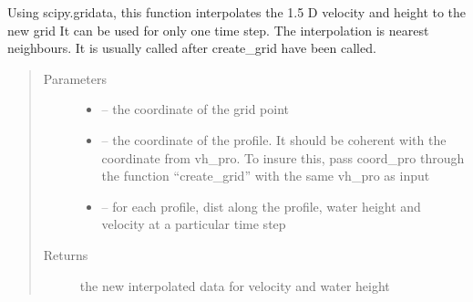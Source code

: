 \documentclass[letterpaper,10pt,english]{sphinxmanual}
\begin{document}
\begin{fulllineitems}
\label{\detokenize{index:src.manage_grid_8.interpo_nearest}}
Using scipy.gridata, this function interpolates the 1.5 D velocity and height to the new grid
It can be used for only one time step. The interpolation is nearest neighbours.
It is usually called after create\_grid have been called.
\begin{quote}\begin{description}
\item[{Parameters}] \leavevmode\begin{itemize}
\item {} 
 -- the coordinate of the grid point

\item {} 
 -- the coordinate of the profile. It should be coherent with the coordinate from vh\_pro.
To insure this, pass coord\_pro through the function ``create\_grid'' with the same vh\_pro as input

\item {} 
 -- for each profile, dist along the profile, water height and velocity at a particular time step

\end{itemize}

\item[{Returns}] \leavevmode
the new interpolated data for velocity and water height

\end{description}\end{quote}

\end{fulllineitems}

\end{document}
